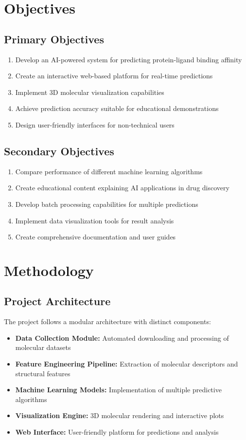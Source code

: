 \documentclass[12pt,a4paper]{article}
\begin{document}
\section{Objectives}

\subsection{Primary Objectives}
\begin{enumerate}
    \item Develop an AI-powered system for predicting protein-ligand binding affinity
    \item Create an interactive web-based platform for real-time predictions
    \item Implement 3D molecular visualization capabilities
    \item Achieve prediction accuracy suitable for educational demonstrations
    \item Design user-friendly interfaces for non-technical users
\end{enumerate}

\subsection{Secondary Objectives}
\begin{enumerate}
    \item Compare performance of different machine learning algorithms
    \item Create educational content explaining AI applications in drug discovery
    \item Develop batch processing capabilities for multiple predictions
    \item Implement data visualization tools for result analysis
    \item Create comprehensive documentation and user guides
\end{enumerate}

\section{Methodology}

\subsection{Project Architecture}
The project follows a modular architecture with distinct components:
\begin{itemize}
    \item \textbf{Data Collection Module:} Automated downloading and processing of molecular datasets
    \item \textbf{Feature Engineering Pipeline:} Extraction of molecular descriptors and structural features
    \item \textbf{Machine Learning Models:} Implementation of multiple predictive algorithms
    \item \textbf{Visualization Engine:} 3D molecular rendering and interactive plots
    \item \textbf{Web Interface:} User-friendly platform for predictions and analysis
\end{itemize}
\end{document}
